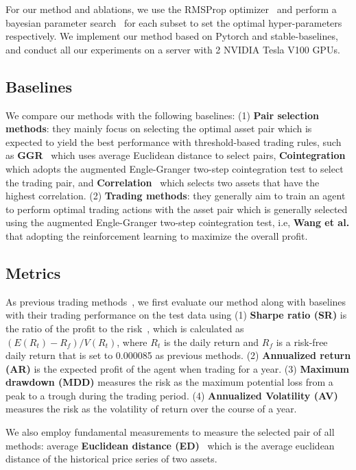 \documentclass[sigconf]{acmart}
\begin{document}
For our method and ablations, we use the RMSProp optimizer~\cite{tieleman2012rmsprop} and perform a bayesian parameter search~\cite{shahriari2015taking} for each subset to set the optimal hyper-parameters respectively. We implement our method based on Pytorch and stable-baselines, and conduct all our experiments on a server with 2 NVIDIA Tesla V100 GPUs.
	
\subsection{Baselines}
We compare our methods with the following baselines:
(1) \textbf{Pair selection methods}: they mainly focus on selecting the optimal asset pair which is expected to yield the best performance with threshold-based trading rules, such as \textbf{GGR}~\cite{gatev2006pairs} which uses average Euclidean distance to select pairs, \textbf{Cointegration}~\cite{vidyamurthy2004pairs} which adopts the augmented Engle-Granger two-step cointegration test to select the trading pair, and \textbf{Correlation}~\cite{elliott2005pairs} which selects two assets that have the highest correlation.
(2) \textbf{Trading methods}: they generally aim to train an agent to perform optimal trading actions with the asset pair which is generally selected using the augmented Engle-Granger two-step cointegration test, i.e, \textbf{Wang et al.} \cite{wang2021improving} that adopting the reinforcement learning to maximize the overall profit.
	
\subsection{Metrics}
As previous trading methods~\cite{wang2021improving}, we first evaluate our method along with baselines with their trading performance on the test data using 
(1) \textbf{Sharpe ratio (SR)} is the ratio of the profit to the risk~\cite{sharpe1994sharpe}, which is calculated as $(E(R_t)-R_f)/V(R_t)$, where $R_t$ is the daily return and $R_f$ is a risk-free daily return that is set to 0.000085 as previous methods.
(2) \textbf{Annualized return (AR)} is the expected profit of the agent when trading for a year. 
(3) \textbf{Maximum drawdown (MDD)} measures the risk as the maximum potential loss from a peak to a trough during the trading period. 
(4) \textbf{Annualized Volatility (AV)} measures the risk as the volatility of return over the course of a year.

We also employ fundamental measurements to measure the selected pair of all methods: average \textbf{Euclidean distance (ED)}~\cite{gatev2006pairs} which is the average euclidean distance of the historical price series of two assets.
\end{document}
